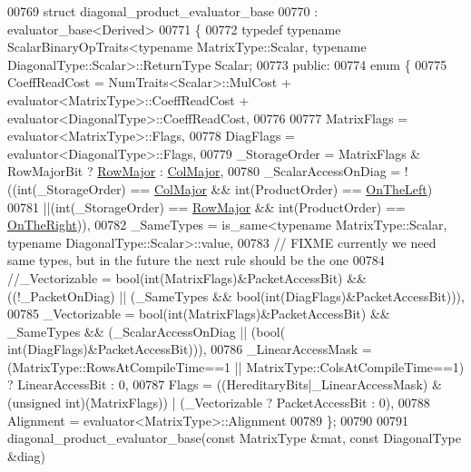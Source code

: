 \begin{DoxyCode}
00769 \textcolor{keyword}{struct }diagonal\_product\_evaluator\_base
00770   : evaluator\_base<Derived>
00771 \{
00772    \textcolor{keyword}{typedef} \textcolor{keyword}{typename} ScalarBinaryOpTraits<typename MatrixType::Scalar, typename
       DiagonalType::Scalar>::ReturnType Scalar;
00773 \textcolor{keyword}{public}:
00774   \textcolor{keyword}{enum} \{
00775     CoeffReadCost = NumTraits<Scalar>::MulCost + evaluator<MatrixType>::CoeffReadCost + 
      evaluator<DiagonalType>::CoeffReadCost,
00776     
00777     MatrixFlags = evaluator<MatrixType>::Flags,
00778     DiagFlags = evaluator<DiagonalType>::Flags,
00779     \_StorageOrder = MatrixFlags & RowMajorBit ? \hyperlink{group__enums_ggaacded1a18ae58b0f554751f6cdf9eb13acfcde9cd8677c5f7caf6bd603666aae3}{RowMajor} : \hyperlink{group__enums_ggaacded1a18ae58b0f554751f6cdf9eb13a0cbd4bdd0abcfc0224c5fcb5e4f6669a}{ColMajor},
00780     \_ScalarAccessOnDiag =  !((int(\_StorageOrder) == \hyperlink{group__enums_ggaacded1a18ae58b0f554751f6cdf9eb13a0cbd4bdd0abcfc0224c5fcb5e4f6669a}{ColMajor} && int(ProductOrder) == 
      \hyperlink{group__enums_ggac22de43beeac7a78b384f99bed5cee0ba129609b3bdf23b071f5f86cf2f995ec4}{OnTheLeft})
00781                            ||(\textcolor{keywordtype}{int}(\_StorageOrder) == \hyperlink{group__enums_ggaacded1a18ae58b0f554751f6cdf9eb13acfcde9cd8677c5f7caf6bd603666aae3}{RowMajor} && int(ProductOrder) == 
      \hyperlink{group__enums_ggac22de43beeac7a78b384f99bed5cee0ba99dc75d8e00b6c3a5bdc31940f47492b}{OnTheRight})),
00782     \_SameTypes = is\_same<typename MatrixType::Scalar, typename DiagonalType::Scalar>::value,
00783     \textcolor{comment}{// FIXME currently we need same types, but in the future the next rule should be the one}
00784     \textcolor{comment}{//\_Vectorizable = bool(int(MatrixFlags)&PacketAccessBit) && ((!\_PacketOnDiag) || (\_SameTypes &&
       bool(int(DiagFlags)&PacketAccessBit))),}
00785     \_Vectorizable = bool(\textcolor{keywordtype}{int}(MatrixFlags)&PacketAccessBit) && \_SameTypes && (\_ScalarAccessOnDiag || (bool(\textcolor{keywordtype}{
      int}(DiagFlags)&PacketAccessBit))),
00786     \_LinearAccessMask = (MatrixType::RowsAtCompileTime==1 || MatrixType::ColsAtCompileTime==1) ? 
      LinearAccessBit : 0,
00787     Flags = ((HereditaryBits|\_LinearAccessMask) & (\textcolor{keywordtype}{unsigned} int)(MatrixFlags)) | (\_Vectorizable ? 
      PacketAccessBit : 0),
00788     Alignment = evaluator<MatrixType>::Alignment
00789   \};
00790   
00791   diagonal\_product\_evaluator\_base(\textcolor{keyword}{const} MatrixType &mat, \textcolor{keyword}{const} DiagonalType &diag)

\end{DoxyCode}
